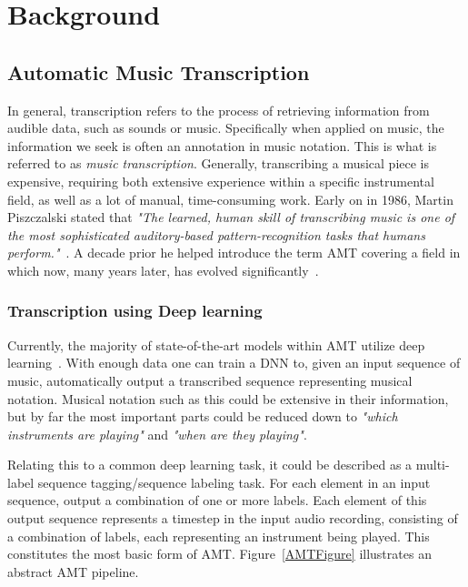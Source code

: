 \chapter{Background}\label{Background}

\section{Automatic Music Transcription}

In general, transcription refers to the process of retrieving information from audible data, such as sounds or music. Specifically when applied on music, the information we seek is often an annotation in music notation. This is what is referred to as \textit{music transcription}. Generally, transcribing a musical piece is expensive, requiring both extensive experience within a specific instrumental field, as well as a lot of manual, time-consuming work. Early on in 1986, Martin Piszczalski stated that \textit{"The learned, human skill of transcribing music is one of the most sophisticated auditory-based pattern-recognition tasks that humans perform."}~\cite{10.5555/15202}. A decade prior he helped introduce the term \acrfull{AMT} covering a field in which now, many years later, has evolved significantly~\cite{piszczalski1977automatic}.

\subsection{Transcription using Deep learning}
Currently, the majority of state-of-the-art models within \gls{AMT} utilize deep learning~\cite{8350302, signals4040042, jamshidi2024machine}. With enough data one can train a \gls{DNN} to, given an input sequence of music, automatically output a transcribed sequence representing musical notation. Musical notation such as this could be extensive in their information, but by far the most important parts could be reduced down to \textit{"which instruments are playing"} and \textit{"when are they playing"}.

Relating this to a common deep learning task, it could be described as a multi-label sequence tagging/sequence labeling task. For each element in an input sequence, output a combination of one or more labels. Each element of this output sequence represents a timestep in the input audio recording, consisting of a combination of labels, each representing an instrument being played. This constitutes the most basic form of \gls{AMT}. Figure~\ref{AMTFigure} illustrates an abstract \gls{AMT} pipeline.

